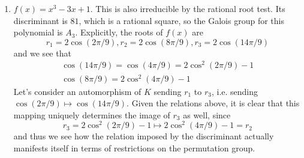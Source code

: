 \documentclass[12pt]{article}
\begin{document}
\begin{enumerate}
\item $f(x)=x^3-3x+1$. This is also irreducible by the rational root test. Its discriminant is $81$, which is a rational square, so the Galois group for this polynomial is $A_3$. Explicitly, the roots of $f(x)$ are
\[r_1=2\cos(2\pi/9), r_2=2\cos(8\pi/9), r_3=2\cos(14\pi/9)\]
and we see that
\begin{gather*}
\cos(14\pi/9)=\cos(4\pi/9)=2\cos^2(2\pi/9)-1\\
\cos(8\pi/9)=2\cos^2(4\pi/9)-1
\end{gather*}
Let's consider an automorphism of $K$ sending $r_1$ to $r_3$, i.e. sending $\cos(2\pi/9)\mapsto\cos(14\pi/9)$. Given the relations above, it is clear that this mapping uniquely determines the image of $r_3$ as well, since
\[r_3=2\cos^2(2\pi/9)-1\mapsto 2\cos^2(4\pi/9)-1=r_2\]
and thus we see how the relation imposed by the discriminant actually manifests itself in terms of restrictions on the permutation group.
\end{enumerate}

\end{document}
